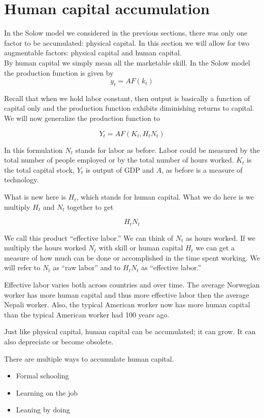 \documentclass[
]{book}
\providecommand{\tightlist}{%
  \setlength{\itemsep}{0pt}\setlength{\parskip}{0pt}}
\begin{document}
\hypertarget{human-capital-accumulation}{%
\section{Human capital accumulation}\label{human-capital-accumulation}}

In the Solow model we considered in the previous sections, there was only one factor to be accumulated: physical capital. In this section we will allow for two augmentable factors: physical capital and human capital.\\
By human capital we simply mean all the marketable skill. In the Solow model the production function is given by
\[y_t=A F(k_t)\]

Recall that when we hold labor constant, then output is basically a function of capital only and the production function exhibits diminishing returns to capital.
We will now generalize the production function to

\[Y_t = A F (K_t, H_tN_t)\]

In this formulation \(N_t\) stands for labor as before. Labor could be measured by the total number of people employed or by the total number of hours worked. \(K_t\) is the total capital stock, \(Y_t\) is output of GDP and \(A\), as before is a measure of technology.

What is new here is \(H_t\), which stands for human capital. What we do here is we multiply \(H_t\) and \(N_t\) together to get

\[H_tN_t\]

We call this product ``effective labor.'' We can think of \(N_t\) as hours worked. If we multiply the hours worked \(N_t\) with skill or human capital \(H_t\) we can get a measure of how much can be done or accomplished in the time spent working. We will refer to \(N_t\) as ``raw labor'' and to \(H_tN_t\) as ``effective labor.''

Effective labor varies both across countries and over time. The average Norwegian worker has more human capital and thus more effective labor then the average Nepali worker. Also, the typical American worker now has more human capital than the typical American worker had 100 years ago.

Just like physical capital, human capital can be accumulated; it can grow. It can also depreciate or become obsolete.

There are multiple ways to accumulate human capital.

\begin{itemize}
\tightlist
\item
  Formal schooling
\item
  Learning on the job
\item
  Leaning by doing
\end{itemize}
\end{document}
